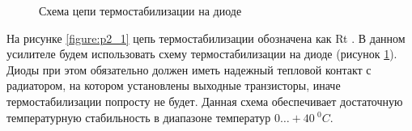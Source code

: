 \begin{figure}[!htbp]
    \caption{Схема цепи термостабилизации на диоде}
    \label{figure:p2_2}
  \end{figure}


На рисунке \ref{figure:p2_1} цепь термостабилизации обозначена как Rt . В данном усилителе будем использовать схему термостабилизации на диоде  (рисунок \ref{figure:p2_2}).
Диоды при этом обязательно должен иметь надежный тепловой контакт с радиатором, на котором установлены выходные транзисторы, иначе термостабилизации  попросту  не  будет.
Данная схема обеспечивает достаточную  температурную стабильность в диапазоне температур $0\ldots +40~^0C$. \par